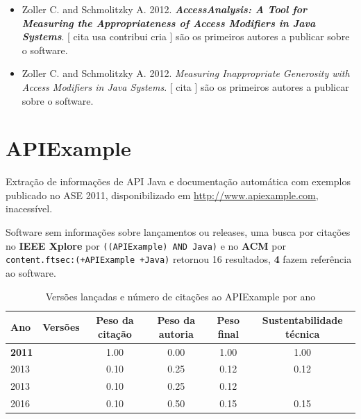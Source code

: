 \begin{itemize}
\item Zoller C. and Schmolitzky A.
      2012.
        \textbf{\textit{ AccessAnalysis: A Tool for Measuring the Appropriateness of Access Modifiers in Java Systems}}.
      [
          cita
          usa
          contribui
          cria
      ]
são os primeiros autores a publicar sobre o software.
\item Zoller C. and Schmolitzky A.
      2012.
        \textit{ Measuring Inappropriate Generosity with Access Modifiers in Java Systems}.
      [
          cita
      ]
são os primeiros autores a publicar sobre o software.
\end{itemize}
\section{APIExample}

Extração de informações de API Java e documentação automática com exemplos
publicado no ASE 2011,
disponibilizado em \url{http://www.apiexample.com},
inacessível.

Software sem informações sobre lançamentos ou releases,
uma busca por citações no {\bf IEEE Xplore} por
\texttt{((APIExample) AND Java)}
e no {\bf ACM} por
\texttt{content.ftsec:(+APIExample +Java)}
retornou
16 resultados,
{\bf 4} fazem referência ao software.


\begin{table}[H]
\caption{Versões lançadas e número de citações ao APIExample por ano}
\centering
\begin{tabular}{| l | c | c | c | c | c |}
  \hline
  Ano & Versões & Peso da citação & Peso da autoria & Peso final & Sustentabilidade técnica \\
  \hline
            {\bf 2011}
          &
          
          &
          1.00
          &
          0.00
          &
          1.00
          &
            {\color{blue} 1.00}
          \\
\hline
            2013
          &
          
          &
          0.10
          &
          0.25
          &
          0.12
          &
            {\color{red} 0.12}
          \\
            2013
          &
          
          &
          0.10
          &
          0.25
          &
          0.12
          &
          \\
\hline
            2016
          &
          
          &
          0.10
          &
          0.50
          &
          0.15
          &
            {\color{red} 0.15}
          \\
\hline
\end{tabular}
\end{table}

